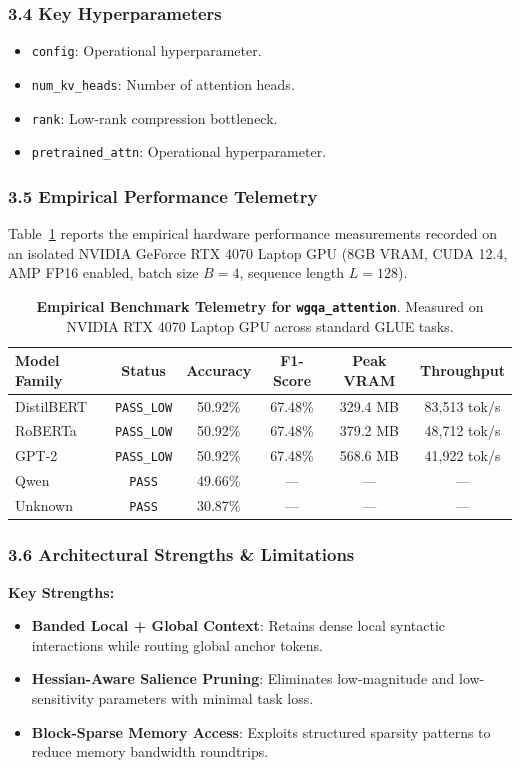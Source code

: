 \subsubsection*{3.4 Key Hyperparameters}
\begin{itemize}
    \item \texttt{config}: Operational hyperparameter.
    \item \texttt{num\_kv\_heads}: Number of attention heads.
    \item \texttt{rank}: Low-rank compression bottleneck.
    \item \texttt{pretrained\_attn}: Operational hyperparameter.
\end{itemize}

\subsubsection*{3.5 Empirical Performance Telemetry}
Table~\ref{tab:telemetry_wgqa_attention} reports the empirical hardware performance measurements recorded on an isolated NVIDIA GeForce RTX 4070 Laptop GPU (8GB VRAM, CUDA 12.4, AMP FP16 enabled, batch size $B=4$, sequence length $L=128$).

\begin{table}[h]
\centering
\small
\caption{\textbf{Empirical Benchmark Telemetry for \texttt{wgqa\_attention}}. Measured on NVIDIA RTX 4070 Laptop GPU across standard GLUE tasks.}
\label{tab:telemetry_wgqa_attention}
\begin{tabular*}{\columnwidth}{@{\extracolsep{\fill}}lccccc}
\toprule
\textbf{Model Family} & \textbf{Status} & \textbf{Accuracy} & \textbf{F1-Score} & \textbf{Peak VRAM} & \textbf{Throughput} \\
\midrule
DistilBERT & \texttt{PASS\_LOW} & 50.92\% & 67.48\% & 329.4 MB & 83,513 tok/s \\
RoBERTa & \texttt{PASS\_LOW} & 50.92\% & 67.48\% & 379.2 MB & 48,712 tok/s \\
GPT-2 & \texttt{PASS\_LOW} & 50.92\% & 67.48\% & 568.6 MB & 41,922 tok/s \\
Qwen & \texttt{PASS} & 49.66\% & --- & --- & --- \\
Unknown & \texttt{PASS} & 30.87\% & --- & --- & --- \\
\bottomrule
\end{tabular*}
\end{table}

\subsubsection*{3.6 Architectural Strengths \& Limitations}
\textbf{Key Strengths:}
\begin{itemize}
    \item \textbf{Banded Local + Global Context}: Retains dense local syntactic interactions while routing global anchor tokens.
    \item \textbf{Hessian-Aware Salience Pruning}: Eliminates low-magnitude and low-sensitivity parameters with minimal task loss.
    \item \textbf{Block-Sparse Memory Access}: Exploits structured sparsity patterns to reduce memory bandwidth roundtrips.
\end{itemize}

